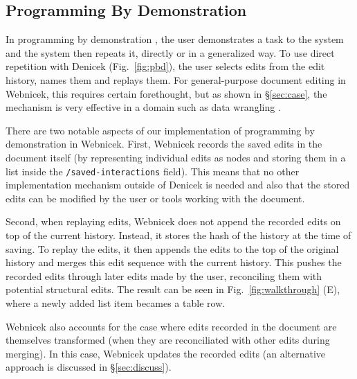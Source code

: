 \documentclass[sigconf,anonymous,screen]{acmart}
\begin{document}

\subsection{Programming By Demonstration}
\label{sec:impl-pbd}

In programming by demonstration \cite{cypher-1993-pbd}, the user demonstrates a task to the
system and the system then repeats it, directly or in a generalized way. To use direct
repetition with Denicek (Fig.~\ref{fig:pbd}), the user selects edits from the edit history,
names them and replays them. For general-purpose document editing in Webnicek, this requires
certain forethought, but as shown in \S\ref{sec:case}, the mechanism is very effective
in a domain such as data wrangling \cite{kandel-2011-wrangler}.

There are two notable aspects of our implementation of programming by demonstration in Webnicek.
First, Webnicek records the saved edits in the document itself (by representing individual edits
as nodes and storing them in a list inside the {\small\Verb_/saved-interactions_} field).
This means that no other implementation mechanism outside of Denicek is needed and also
that the stored edits can be modified by the user or tools working with the document.

Second, when replaying edits, Webnicek does not append the recorded edits on top of the current
history. Instead, it stores the hash of the history at the time of saving. To replay the edits,
it then appends the edits to the top of the original history and merges this edit sequence
with the current history. This pushes the recorded edits through later edits made by the user,
reconciling them with potential structural edits. The result can be seen in Fig.~\ref{fig:walkthrough} (E), where
a newly added list item becames a table row.

Webnicek also accounts for the case where edits recorded in the document are themselves
transformed (when they are reconciliated with other edits during merging). In this case, Webnicek
updates the recorded edits (an alternative approach is discussed in \S\ref{sec:discuss}).

\end{document}
